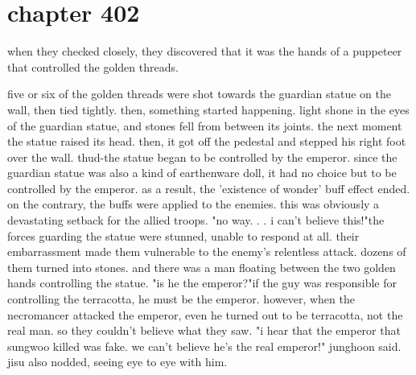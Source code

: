 \section{chapter 402}

when they checked closely, they discovered that it was the hands of a puppeteer that controlled the golden threads.
 




five or six of the golden threads were shot towards the guardian statue on the wall, then tied tightly.
 then, something started happening.
light shone in the eyes of the guardian statue, and stones fell from between its joints.
the next moment the statue raised its head.
 then, it got off the pedestal and stepped his right foot over the wall.
thud-the statue began to be controlled by the emperor.
 since the guardian statue was also a kind of earthenware doll, it had no choice but to be controlled by the emperor.
 as a result, the 'existence of wonder' buff effect ended.
 on the contrary, the buffs were applied to the enemies.
this was obviously a devastating setback for the allied troops.
"no way.
.
.
i can't believe this!"the forces guarding the statue were stunned, unable to respond at all.
their embarrassment made them vulnerable to the enemy's relentless attack.
 dozens of them turned into stones.
and there was a man floating between the two golden hands controlling the statue.
 "is he the emperor?"if the guy was responsible for controlling the terracotta, he must be the emperor.
 however, when the necromancer attacked the emperor, even he turned out to be terracotta, not the real man.
so they couldn't believe what they saw.
"i hear that the emperor that sungwoo killed was fake.
 we can't believe he's the real emperor!" junghoon said.
 jisu also nodded, seeing eye to eye with him.

